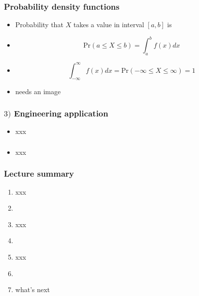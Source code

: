 \documentclass[english,14pt]{beamer}
\begin{document}

\begin{frame}[fragile]

\frametitle{Probability density functions}

\begin{itemize}
\item Probability that $X$ takes a value in interval $[a,b]$ is
	\item[] \[
\mathrm{Pr}(a \leq X \leq b) = \int_a^b f(x) dx
\]
\item[]
\[
\int_{-\infty}^\infty f(x) dx = \mathrm{Pr}(-\infty \leq X \leq \infty) = 1
\]
\item needs an image
\end{itemize}

\end{frame}


\begin{frame}[fragile]

\frametitle{$3)$ Engineering application}

\begin{itemize}
	\item xxx
\end{itemize}

\end{frame}



\begin{frame}[fragile]

\frametitle{}

\begin{itemize}
	\item xxx
\end{itemize}

\end{frame}


\begin{frame}[fragile]

\frametitle{Lecture summary}

\begin{enumerate}
	\item xxx
	
	\item[]
	
	\item xxx
	
	\item[]
	
	\item xxx
	
	\item[]
	
	\item what's next
	
\end{enumerate}

\end{frame}
\end{document}
